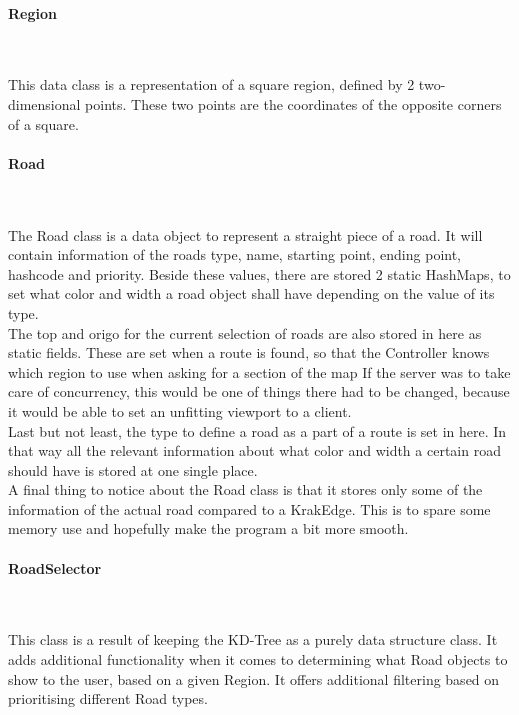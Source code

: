 \documentclass[a4paper,10pt,titlepage]{article}
\begin{document}
				\paragraph{Region}\mbox{}\
				
This data class is a representation of a square region, defined by 2 two-dimensional points. These two points are the coordinates of the opposite corners of a square.
				
				\paragraph{Road}\mbox{}\
				
The Road class is a data object to represent a straight piece of a road. It will contain information of the roads type, name, starting point, ending point, hashcode and priority. Beside these values, there are stored 2 static HashMaps, to set what color and width a road object shall have depending on the value of its type. \\
The top and origo for the current selection of roads are also stored in here as static fields. These are set when a route is found, so that the Controller knows which region to use when asking for a section of the map
If the server was to take care of concurrency, this would be one of things there had to be changed, because it would be able to set an unfitting viewport to a client.\\
Last but not least, the type to define a road as a part of a route is set in here. In that way all the relevant information about what color and width a certain road should have is stored at one single place.\\
A final thing to notice about the Road class is that it stores only some of the information of the actual road compared to a KrakEdge. This is to spare some memory use and hopefully make the program a bit more smooth.\\

				
				\paragraph{RoadSelector}\mbox{}\
				
This class is a result of keeping the KD-Tree as a purely data structure class. It adds additional functionality when it comes to determining what Road objects to show to the user, based on a given Region. It offers additional filtering based on prioritising different Road types.\\
\end{document}
